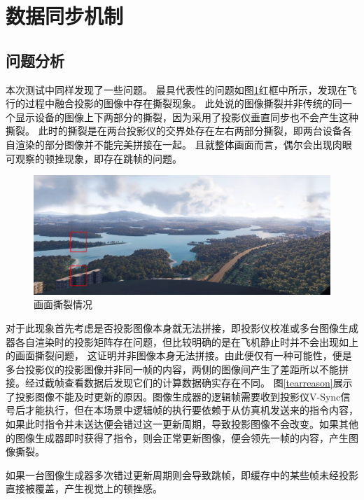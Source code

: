 \section{数据同步机制}
\subsection{问题分析}
本次测试中同样发现了一些问题。
最具代表性的问题如图\ref{tear}红框中所示，发现在飞行的过程中融合投影的图像中存在撕裂现象。
此处说的图像撕裂并非传统的同一个显示设备的图像上下两部分的撕裂，因为采用了投影仪垂直同步也不会产生这种撕裂。
此时的撕裂是在两台投影仪的交界处存在左右两部分撕裂，即两台设备各自渲染的部分图像并不能完美拼接在一起。
且就整体画面而言，偶尔会出现肉眼可观察的顿挫现象，即存在跳帧的问题。
\begin{figure}[h!]
    \begin{center}
        \includegraphics[width=\textwidth]{pictures/tearmark.png}
        \caption{画面撕裂情况}
        \label{tear}
    \end{center}
\end{figure}
\par
对于此现象首先考虑是否投影图像本身就无法拼接，即投影仪校准或多台图像生成器各自渲染时的投影矩阵存在问题，但比较明确的是在飞机静止时并不会出现如上的画面撕裂问题，
这证明并非图像本身无法拼接。由此便仅有一种可能性，便是多台投影仪的投影图像并非同一帧的内容，两侧的图像间产生了差距所以不能拼接。经过截帧查看数据后发现它们的计算数据确实存在不同。
图\ref{tearreason}展示了投影图像不能及时更新的原因。图像生成器的逻辑帧需要收到投影仪V-Sync信号后才能执行，但在本场景中逻辑帧的执行要依赖于从仿真机发送来的指令内容，
如果此时指令并未送达便会错过这一更新周期，导致投影图像不会改变。如果其他的图像生成器即时获得了指令，则会正常更新图像，便会领先一帧的内容，产生图像撕裂。
\par
如果一台图像生成器多次错过更新周期则会导致跳帧，即缓存中的某些帧未经投影直接被覆盖，产生视觉上的顿挫感。
